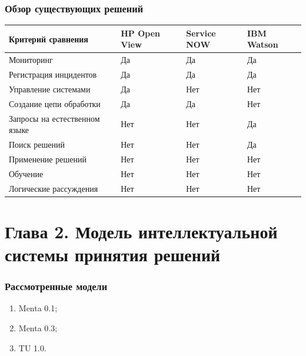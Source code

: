 \documentclass[14pt]{beamer}
\begin{document}
\begin{frame}
\frametitle{Обзор существующих решений}
\begin{table}
	
\small
\begin{tabular} {|p{5cm}|p{1cm}|p{1.5cm}|p{1.5cm}|}

\hline
\textbf{Критерий сравнения} & HP Open View & Service NOW & IBM Watson\\
\hline
   Мониторинг & Да & Да & Да  \\
   \hline
   Регистрация инцидентов & Да & Да & Да \\
   \hline
   Управление системами & Да & Нет & Нет  \\
   \hline 
   Создание цепи обработки & Да & Да & Нет \\
   \hline 
   Запросы на естественном языке & Нет & Нет & Да \\
   \hline 
   Поиск решений & Нет & Нет & Да \\
   \hline 
   Применение решений & Нет & Нет & Нет  \\
   \hline
   Обучение & Нет & Нет & Нет \\
   \hline
   Логические рассуждения & Нет & Нет & Нет  \\
   \hline
  
\end{tabular}
\end{table}
\end{frame}


%
%
\section[Глава 2]{Глава 2. Модель интеллектуальной системы принятия решений}
\begin{frame}
\frametitle{Рассмотренные модели}
\begin{enumerate}
	\item Menta 0.1;
	\item Menta 0.3;
	\item TU 1.0.
\end{enumerate}
\end{frame}
\end{document}
